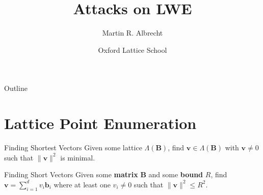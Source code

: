 \documentclass[presentation,smaller]{beamer}
\author{Martin R. Albrecht}
\date{Oxford Lattice School}
\title{Attacks on LWE}
\renewcommand{\vec}[1]{\mathbf{#1}\xspace}
\newcommand{\mat}[1]{\mathbf{#1}\xspace}
\begin{document}
\maketitle
\begin{frame}{Outline}
\tableofcontents
\end{frame}


\section{Lattice Point Enumeration}
\label{sec:orgfd85a0c}
\begin{frame}[label={sec:org52e4d27}]{Finding Shortest Vectors}
Given some lattice \(Λ(\mat{B})\), find \(\vec{v} \in Λ(\mat{B})\) with \(\vec{v} \neq 0\) such that \(\|\vec{v}\|^2\) is minimal.
\end{frame}

\begin{frame}[label={sec:orge7a419b}]{Finding Short Vectors}
Given some \textbf{matrix} \(\mat{B}\) and some \textbf{bound} \(R\), find \(\vec{v} = \sum_{i=1}^{d} v_i \vec{b}_i\) where at least one \(v_i \neq 0\) such that \(\|\vec{v}\|^2 \leq R^2\).
\end{frame}
\end{document}
